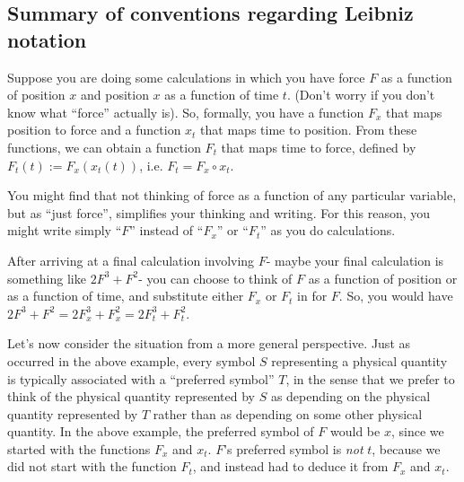 \documentclass{article}
\begin{document}

\subsection*{Summary of conventions regarding Leibniz notation}

Suppose you are doing some calculations in which you have force $F$ as a function of position $x$ and position $x$ as a function of time $t$. (Don't worry if you don't know what ``force'' actually is). So, formally, you have a function $F_x$ that maps position to force and a function $x_t$ that maps time to position. From these functions, we can obtain a function $F_t$ that maps time to force, defined by $F_t(t) := F_x(x_t(t))$, i.e. $F_t = F_x \circ x_t$.

You might find that not thinking of force as a function of any particular variable, but as ``just force'', simplifies your thinking and writing. For this reason, you might write simply ``$F$'' instead of ``$F_x$'' or ``$F_t$'' as you do calculations.

After arriving at a final calculation involving $F$- maybe your final calculation is something like $2 F^3 + F^2$- you can choose to think of $F$ as a function of position or as a function of time, and substitute either $F_x$ or $F_t$ in for $F$. So, you would have $2 F^3 + F^2 = 2 F_x^3 + F_x^2 = 2 F_t^3 + F_t^2$.

\vspace{.25cm}

Let's now consider the situation from a more general perspective. Just as occurred in the above example, every symbol $S$ representing a physical quantity is typically associated with a ``preferred symbol'' $T$, in the sense that we prefer to think of the physical quantity represented by $S$ as depending on the physical quantity represented by $T$ rather than as depending on some other physical quantity. In the above example, the preferred symbol of $F$ would be $x$, since we started with the functions $F_x$ and $x_t$. $F$'s preferred symbol is \textit{not} $t$, because we did not start with the function $F_t$, and instead had to deduce it from $F_x$ and $x_t$.
\end{document}
